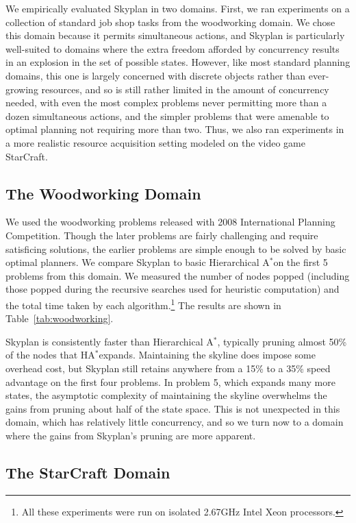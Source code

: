 \documentclass[letterpaper]{article}
\theoremstyle{plain} \newtheorem{theorem}{Theorem} \newtheorem{proposition}{Proposition} \newtheorem{lemma}{Lemma}
\theoremstyle{definition} \newtheorem{definition}{Definition} \newtheorem{conjecture}{Conjecture} \newtheorem*{example}{Example}
\theoremstyle{remark} \newtheorem*{remark}{Remark} \newtheorem*{note}{Note} \newtheorem{case}{Case}
\newcommand{\Astar}{A$^*$}
\begin{document}
We empirically evaluated Skyplan in two domains. First, we ran experiments on a collection
of standard job shop tasks from the woodworking domain. We chose this domain because it
permits simultaneous actions, and Skyplan is particularly well-suited to domains where the
extra freedom afforded by concurrency results in an explosion in the set of possible
states. However, like most standard planning domains, this one is largely concerned with
discrete objects rather than ever-growing resources, and so is still rather limited in the
amount of concurrency needed, with even the most complex problems never permitting more
than a dozen simultaneous actions, and the simpler problems that were amenable to optimal
planning not requiring more than two. Thus, we also ran experiments in a more realistic
resource acquisition setting modeled on the video game StarCraft.

\subsection{The Woodworking Domain}

We used the woodworking problems released with 2008
International Planning Competition.
Though the later problems are fairly challenging and require satisficing solutions,
the earlier problems are simple enough to be solved by basic optimal planners. We compare
Skyplan to basic Hierarchical \Astar on the first 5 problems from this domain. We measured
the number of nodes popped (including those popped during the recursive searches used
for heuristic computation) and the total time taken by each algorithm.\footnote{All
these experiments were run on isolated 2.67GHz Intel Xeon processors.} The results are
shown in Table~\ref{tab:woodworking}.

Skyplan is consistently faster than Hierarchical \Astar, typically pruning almost 50\% of the
nodes that H\Astar expands. Maintaining the skyline does impose some overhead cost, but Skyplan
still retains anywhere from a 15\% to a 35\% speed advantage on the first four problems. In problem 5, which expands many more states, the asymptotic complexity of maintaining the skyline overwhelms the gains from pruning about half of the state space. This is not unexpected in this domain, which has relatively little concurrency, and so we turn now to a domain where the gains from Skyplan's pruning are more apparent.

\subsection{The StarCraft Domain}
\end{document}
